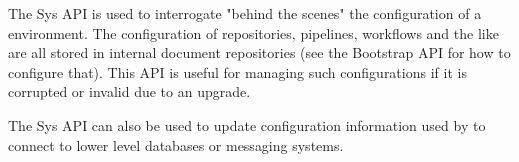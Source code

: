 The Sys API is used to interrogate "behind the scenes" the configuration of a \Rapture
environment. The configuration of repositories, pipelines, workflows and the like are all stored
in internal \Rapture document repositories (see the Bootstrap API for how to configure that). This API
is useful for managing such configurations if it is corrupted or invalid due to an upgrade.

The Sys API can also be used to update configuration information used by \Rapture to connect to lower level
databases or messaging systems.
